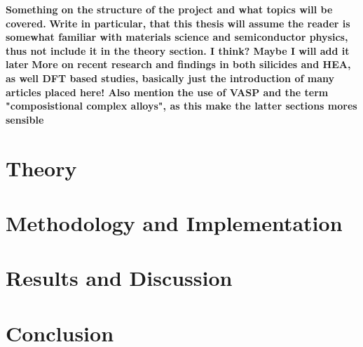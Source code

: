 \documentclass[UKenglish]{ifimaster}  %
\begin{document}
\textbf{Something on the structure of the project and what topics will be covered.}
\textbf{Write in particular, that this thesis will assume the reader is somewhat familiar with materials science and semiconductor physics, thus not include it in the theory section. I think? Maybe I will add it later}
\textbf{More on recent research and findings in both silicides and HEA, as well DFT based studies, basically just the introduction of many articles placed here! Also mention the use of VASP and the term "composistional complex alloys", as this make the latter sections mores sensible} 


\part{Theory}                    %





\part{Methodology and Implementation}



\part{Results and Discussion}



\part{Conclusion}

\backmatter{}
\printbibliography
\end{document}
